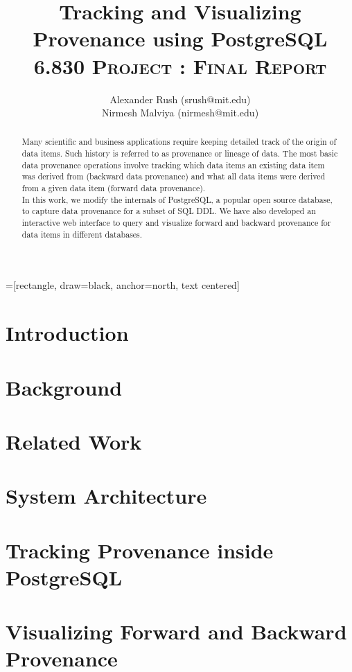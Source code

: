 \documentclass[11pt]{article}
\title{\textbf{Tracking and Visualizing Provenance using PostgreSQL}\\
\textsc{6.830 Project : Final Report}}
\author{Alexander Rush (srush@mit.edu)\\ Nirmesh Malviya (nirmesh@mit.edu)}
\begin{document}
=[rectangle, draw=black, anchor=north, text centered]
\maketitle

\begin{abstract}
Many scientific and business applications require keeping detailed track of the origin of data items. Such history is referred to as provenance or lineage of data. The most basic data provenance operations involve tracking which data items an existing data item was derived from (backward data provenance) and what all data items were derived from a given data item (forward data provenance). \\

In this work, we modify the internals of PostgreSQL, a popular open source database, to capture data provenance for a subset of SQL DDL. We have also developed an interactive web interface to query and visualize forward and backward provenance for data items in different databases.
\end{abstract}

\section{Introduction}


\section{Background} \label{background}


 \section{Related Work}	\label{related}


\section{System Architecture} \label{archi}




\section{Tracking Provenance inside PostgreSQL} \label{implement}



\section{Visualizing Forward and Backward Provenance} \label{visualizer}
\end{document}
